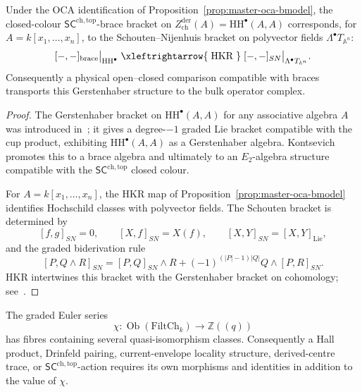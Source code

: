 \begin{corollary}
\label{cor:master-oca-bmodel-schouten}
Under the OCA identification of
Proposition~\ref{prop:master-oca-bmodel}, the closed-colour
$\mathsf{SC}^{\mathrm{ch,top}}$-brace bracket on
$Z^{\mathrm{der}}_{\mathrm{ch}}(A) = \mathrm{HH}^\bullet(A, A)$
corresponds, for $A = k[x_1, \ldots, x_n]$, to the
Schouten--Nijenhuis bracket on polyvector fields
$\Lambda^\bullet T_{\mathbb A^n}$:
\[
[-, -]_{\mathrm{brace}}\bigl|_{\mathrm{HH}^\bullet}
 \;\xleftrightarrow{\;\mathrm{HKR}\;}\;
[-, -]_{SN}\bigl|_{\Lambda^\bullet T_{\mathbb A^n}}.
\]
Consequently a physical open--closed comparison compatible with
braces transports this Gerstenhaber structure to the bulk operator
complex.
\end{corollary}

\begin{proof}
The Gerstenhaber bracket on $\mathrm{HH}^\bullet(A, A)$ for any
associative algebra $A$ was introduced
in~\cite{Ger63}; it gives a degree-$-1$ graded Lie bracket compatible
with the cup product, exhibiting $\mathrm{HH}^\bullet(A, A)$ as a
Gerstenhaber algebra. Kontsevich~\cite{Kon99} promotes this to a
brace algebra and ultimately to an $E_2$-algebra structure compatible
with the $\mathsf{SC}^{\mathrm{ch,top}}$ closed colour.

For $A=k[x_1,\ldots,x_n]$, the HKR map of
Proposition~\ref{prop:master-oca-bmodel} identifies Hochschild classes
with polyvector fields.  The Schouten bracket is determined by
\[
 [f,g]_{SN}=0,
 \qquad
 [X,f]_{SN}=X(f),
 \qquad
 [X,Y]_{SN}=[X,Y]_{\mathrm{Lie}},
\]
and the graded biderivation rule
\[
 [P,Q\wedge R]_{SN}
 =[P,Q]_{SN}\wedge R
 +(-1)^{(|P|-1)|Q|}Q\wedge[P,R]_{SN}.
\]
HKR intertwines this bracket with the Gerstenhaber bracket on
cohomology; see~\cite[\S9.4]{Wei94}.
\end{proof}

\begin{lemma}
\label{lem:master-scalar-non-faithfulness}
The graded Euler series
\[
\chi\colon \operatorname{Ob}(\mathrm{FiltCh}_k)
\longrightarrow \mathbb Z(\!(q)\!)
\]
has fibres containing several quasi-isomorphism classes.  Consequently
a Hall product, Drinfeld pairing, current-envelope locality structure,
derived-centre trace, or
$\mathsf{SC}^{\mathrm{ch,top}}$-action requires its own morphisms and
identities in addition to the value of $\chi$.
\end{lemma}

